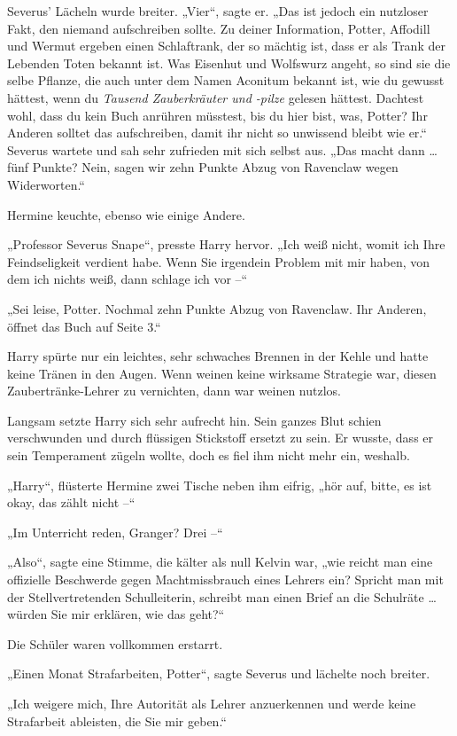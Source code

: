 {Severus' Lächeln wurde breiter. „Vier“, sagte er. „Das ist jedoch ein nutzloser Fakt, den niemand aufschreiben sollte. Zu deiner Information, Potter, Affodill und Wermut ergeben einen Schlaftrank, der so mächtig ist, dass er als Trank der Lebenden Toten bekannt ist. Was Eisenhut und Wolfswurz angeht, so sind sie die selbe Pflanze, die auch unter dem Namen Aconitum bekannt ist, wie du gewusst hättest, wenn du \emph{Tausend Zauberkräuter und -pilze} gelesen hättest. Dachtest wohl, dass du kein Buch anrühren müsstest, bis du hier bist, was, Potter? Ihr Anderen solltet das aufschreiben, damit ihr nicht so unwissend bleibt wie er.“ Severus wartete und sah sehr zufrieden mit sich selbst aus. „Das macht dann … fünf Punkte? Nein, sagen wir zehn Punkte Abzug von Ravenclaw wegen Widerworten.“

Hermine keuchte, ebenso wie einige Andere.

„Professor Severus Snape“, presste Harry hervor. „Ich weiß nicht, womit ich Ihre Feindseligkeit verdient habe. Wenn Sie irgendein Problem mit mir haben, von dem ich nichts weiß, dann schlage ich vor --“

„Sei leise, Potter. Nochmal zehn Punkte Abzug von Ravenclaw. Ihr Anderen, öffnet das Buch auf Seite 3.“

Harry spürte nur ein leichtes, sehr schwaches Brennen in der Kehle und hatte keine Tränen in den Augen. Wenn weinen keine wirksame Strategie war, diesen Zaubertränke-Lehrer zu vernichten, dann war weinen nutzlos.

Langsam setzte Harry sich sehr aufrecht hin. Sein ganzes Blut schien verschwunden und durch flüssigen Stickstoff ersetzt zu sein. Er wusste, dass er sein Temperament zügeln wollte, doch es fiel ihm nicht mehr ein, weshalb.

„Harry“, flüsterte Hermine zwei Tische neben ihm eifrig, „hör auf, bitte, es ist okay, das zählt nicht --“

„Im Unterricht reden, Granger? Drei --“

„Also“, sagte eine Stimme, die kälter als null Kelvin war, „wie reicht man eine offizielle Beschwerde gegen Machtmissbrauch eines Lehrers ein? Spricht man mit der Stellvertretenden Schulleiterin, schreibt man einen Brief an die Schulräte … würden Sie mir erklären, wie das geht?“

Die Schüler waren vollkommen erstarrt.

„Einen Monat Strafarbeiten, Potter“, sagte Severus und lächelte noch breiter.

„Ich weigere mich, Ihre Autorität als Lehrer anzuerkennen und werde keine Strafarbeit ableisten, die Sie mir geben.“

}
